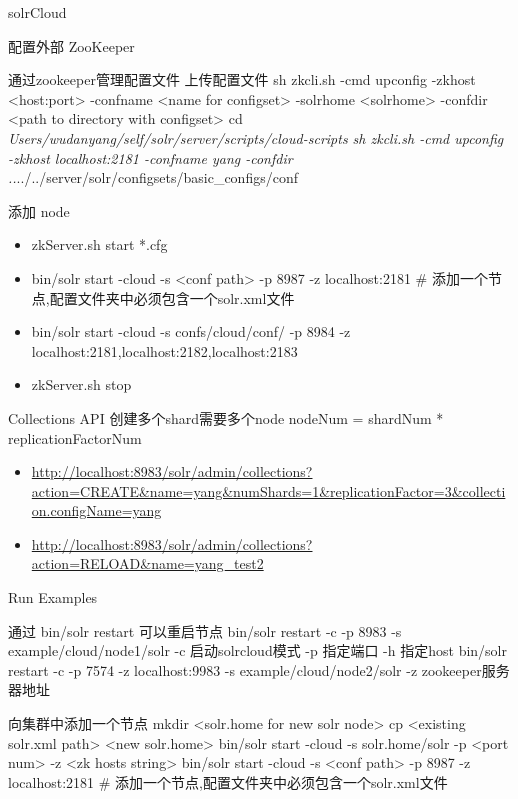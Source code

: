 \documentclass[presentation]{beamer}
\begin{document}
\begin{frame}[fragile,label={sec:org80f600b}]{solrCloud}
\begin{block}{配置外部 ZooKeeper}
\begin{block}{通过zookeeper管理配置文件}
上传配置文件
sh zkcli.sh -cmd upconfig -zkhost <host:port> -confname <name for configset> -solrhome <solrhome> -confdir <path to directory with configset>
cd \emph{Users/wudanyang/self/solr/server/scripts/cloud-scripts
sh zkcli.sh -cmd upconfig -zkhost localhost:2181 -confname yang -confdir ..}../../server/solr/configsets/basic\_configs/conf
\end{block}


\begin{block}{添加 node}
\begin{itemize}
\item zkServer.sh start *.cfg
\item bin/solr start -cloud -s <conf path> -p 8987 -z localhost:2181 \# 添加一个节点,配置文件夹中必须包含一个solr.xml文件
\item bin/solr start -cloud -s confs/cloud/conf/ -p 8984 -z localhost:2181,localhost:2182,localhost:2183
\item zkServer.sh stop
\end{itemize}
\end{block}


\begin{block}{Collections API}
创建多个shard需要多个node
nodeNum = shardNum * replicationFactorNum
\begin{itemize}
\item \url{http://localhost:8983/solr/admin/collections?action=CREATE\&name=yang\&numShards=1\&replicationFactor=3\&collection.configName=yang}
\item \url{http://localhost:8983/solr/admin/collections?action=RELOAD\&name=yang\_test2}
\end{itemize}
\end{block}
\end{block}


\begin{block}{Run Examples}
\begin{block}{通过 bin/solr restart 可以重启节点}
bin/solr restart -c -p 8983 -s example/cloud/node1/solr
-c 启动solrcloud模式
-p 指定端口
-h 指定host
bin/solr restart -c -p 7574 -z localhost:9983 -s example/cloud/node2/solr
-z zookeeper服务器地址
\end{block}
\begin{block}{向集群中添加一个节点}
mkdir <solr.home for new solr node>
cp <existing solr.xml path> <new solr.home>
bin/solr start -cloud -s solr.home/solr -p <port num> -z <zk hosts string>
bin/solr start -cloud -s <conf path> -p 8987 -z localhost:2181 \# 添加一个节点,配置文件夹中必须包含一个solr.xml文件


\end{block}
\end{block}
\end{frame}
\end{document}
